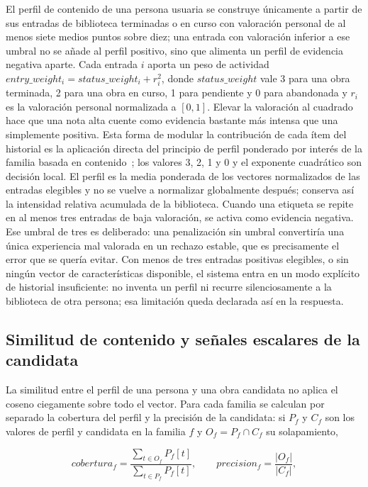 El perfil de contenido de una persona usuaria se construye únicamente a partir de sus
entradas de biblioteca terminadas o en curso con valoración personal de al menos siete medios
puntos sobre diez; una entrada con valoración inferior a ese umbral no se añade al perfil
positivo, sino que alimenta un perfil de evidencia negativa aparte. Cada entrada \(i\) aporta
un peso de actividad \(entry\_weight_i = status\_weight_i + r_i^2\), donde \(status\_weight\)
vale 3 para una obra terminada, 2 para una obra en curso, 1 para pendiente y 0 para abandonada
y \(r_i\) es la valoración personal normalizada a \([0,1]\). Elevar la valoración al cuadrado
hace que una nota alta cuente como evidencia bastante más intensa que una simplemente
positiva. Esta forma de modular la contribución de cada ítem del historial es la aplicación
directa del principio de perfil ponderado por interés de la familia basada en
contenido~\cite{pazzani2007content}; los valores 3, 2, 1 y 0 y el exponente cuadrático son
decisión local. El perfil es la media ponderada de los vectores normalizados de las entradas
elegibles y no se vuelve a normalizar globalmente después; conserva así la intensidad relativa
acumulada de la biblioteca. Cuando una etiqueta se repite en al menos tres entradas de baja
valoración, se activa como evidencia negativa. Ese umbral de tres es deliberado: una
penalización sin umbral convertiría una única experiencia mal valorada en un rechazo estable,
que es precisamente el error que se quería evitar. Con menos de tres entradas positivas
elegibles, o sin ningún vector de características disponible, el sistema entra en un modo explícito de
historial insuficiente: no inventa un perfil ni recurre silenciosamente a la biblioteca de otra
persona; esa limitación queda declarada así en la respuesta.

\subsection{Similitud de contenido y señales escalares de la candidata}\label{sec:alg-similitud}

La similitud entre el perfil de una persona y una obra candidata no aplica el coseno
ciegamente sobre todo el vector. Para cada familia se calculan por separado la cobertura del
perfil y la precisión de la candidata: si \(P_f\) y \(C_f\) son los valores de perfil y
candidata en la familia \(f\) y \(O_f = P_f \cap C_f\) su solapamiento,

\[
cobertura_f = \frac{\sum_{t \in O_f} P_f[t]}{\sum_{t \in P_f} P_f[t]}, \qquad
precision_f = \frac{|O_f|}{|C_f|} ,
\]

